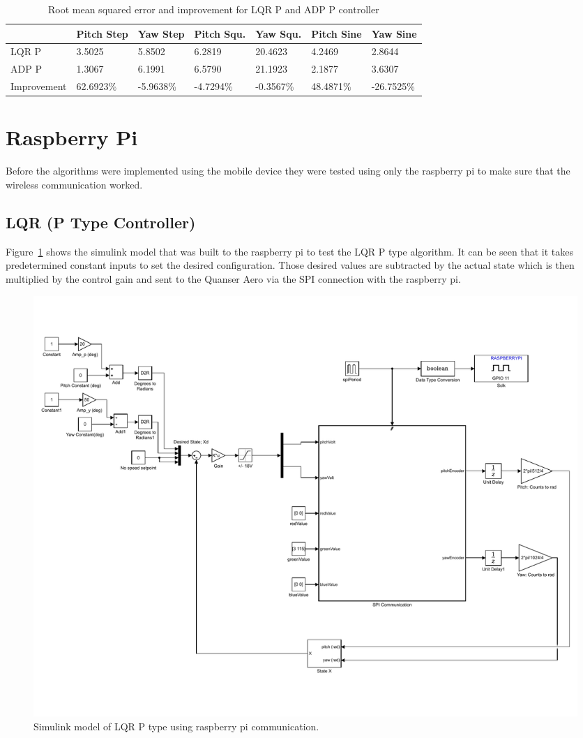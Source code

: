 \begin{table}
    \centering
    \begin{tabular}{l|l|l|l|l|l|l}
        \toprule
        \textbf{} & \textbf{Pitch Step} & \textbf{Yaw Step} & \textbf{Pitch Squ.} & \textbf{Yaw Squ.} & \textbf{Pitch Sine} & \textbf{Yaw Sine}\\
        \toprule
        LQR P & 3.5025 & 5.8502 & 6.2819 & 20.4623 & 4.2469 & 2.8644\\
        ADP P & 1.3067 & 6.1991 & 6.5790 & 21.1923 & 2.1877 & 3.6307\\
        Improvement & 62.6923\% & -5.9638\%  & -4.7294\% & -0.3567\% & 48.4871\% & -26.7525\% \\
    \end{tabular}
    \caption{Root mean squared error and improvement for LQR P and ADP P controller}
    \label{tab:RMSE_LQR_ADP}
\end{table}

\section{Raspberry Pi}
Before the algorithms were implemented using the mobile device they were tested using only the raspberry pi to make sure that the wireless communication worked.
\subsection{LQR (P Type Controller)}
Figure~\ref{fig:LQR_RaspPi} shows the simulink model that was built to the raspberry pi to test the LQR P type algorithm.  It can be seen that it takes predetermined constant inputs to set the desired configuration.  Those desired values are subtracted by the actual state which is then multiplied by the control gain and sent to the Quanser Aero via the SPI connection with the raspberry pi.
\begin{figure}[!htbp]
    \centering
    \includegraphics[width=.62\textwidth,keepaspectratio=true]{figs/img/LQR_RaspPi}
    \caption{Simulink model of LQR P type using raspberry pi communication.}
    \label{fig:LQR_RaspPi}
\end{figure}


